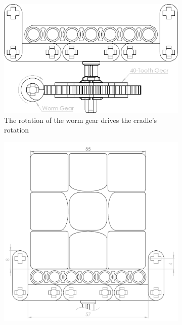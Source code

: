 \documentclass{report}
\begin{document}
	\begin{figure}[H]
		\centering
		\begin{subfigure}[b]{0.25\textwidth}
			\includegraphics[width=\textwidth]{Resources/Images/dwgCradleWormGear.png}
			\caption{The rotation of the worm gear drives the cradle's rotation}
			\label{fig:dwgCradleWormGear}
		\end{subfigure}
		\hspace{10mm}
		\begin{subfigure}[b]{0.25\textwidth}
			\includegraphics[width=\textwidth]{Resources/Images/dwgCradleCurvedEdgeNormal.png}

\end{subfigure}
\end{figure}
\end{document}
